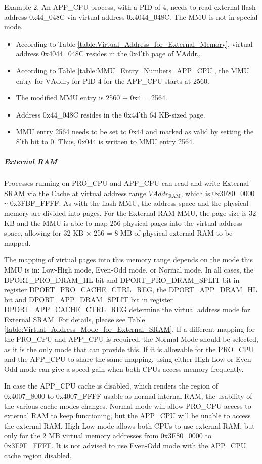 Example 2. An APP\_CPU process, with a PID of 4, needs to read external flash address 0x44\_048C via virtual address 0x4044\_048C. The MMU is not in special mode.
\begin{itemize}
\itemsep-0.5em
\item According to Table \ref{table:Virtual_Address_for_External_Memory}, virtual address 0x4044\_048C resides in the 0x4'th page of $\mathrm{VAddr}_{2}$.
\item According to Table \ref{table:MMU_Entry_Numbers_APP_CPU}, the MMU entry for $\mathrm{VAddr}_{2}$ for PID 4 for the APP\_CPU starts at 2560.
\item The modified MMU entry is 2560 + 0x4 = 2564.
\item Address 0x44\_048C resides in the 0x44'th 64 KB-sized page.
\item MMU entry 2564 needs to be set to 0x44 and marked as valid by setting the 8'th bit to 0. Thus, 0x044 is written to MMU entry 2564.
\end{itemize}

\subparagraph{External RAM}

Processes running on PRO\_CPU and APP\_CPU can read and write External SRAM via the Cache at virtual address range $VAddr_{\mathrm{RAM}}$, which is  0x3F80\_0000 \verb+~+ 0x3FBF\_FFFF. As with the flash MMU, the address space and the physical memory are divided into pages. For the External RAM MMU, the page size is 32 KB and the MMU is able to map 256 physical pages into the virtual address space, allowing for 32 KB × 256 = 8 MB of physical external RAM to be mapped.

The mapping of virtual pages into this memory range depends on the mode this MMU is in: Low-High mode, Even-Odd mode, or Normal mode. In all cases, the DPORT\_PRO\_DRAM\_HL bit and DPORT\_PRO\_DRAM\_SPLIT bit in register DPORT\_PRO\_CACHE\_CTRL\_REG, the DPORT\_APP\_DRAM\_HL bit and DPORT\_APP\_DRAM\_SPLIT bit in register DPORT\_APP\_CACHE\_CTRL\_REG determine the virtual address mode for External SRAM. For details, please see Table \ref{table:Virtual_Address_Mode_for_External_SRAM}. If a different mapping for the PRO\_CPU and APP\_CPU is required, the Normal Mode should be selected, as it is the only mode that can provide this. If it is allowable for the PRO\_CPU and the APP\_CPU to share the same mapping, using either High-Low or Even-Odd mode can give a speed gain when both CPUs access memory frequently.

In case the APP\_CPU cache is disabled, which renders the region of 0x4007\_8000 to 0x4007\_FFFF usable as normal internal RAM, the usability of the various cache modes changes. Normal mode will allow PRO\_CPU access to external RAM to keep functioning, but the APP\_CPU will be unable to access the external RAM. High-Low mode allows both CPUs to use external RAM, but only for the 2 MB virtual memory addresses from 0x3F80\_0000 to 0x3F9F\_FFFF. It is not advised to use Even-Odd mode with the APP\_CPU cache region disabled.


